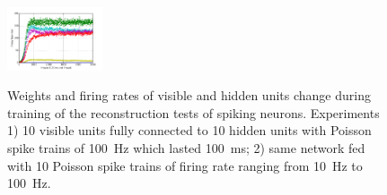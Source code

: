 \documentclass[conference]{IEEEtran}
\begin{document}
\begin{figure}
{			\centering
			\includegraphics[width=0.25\textwidth]{exp1_hid_s}
		}
		\\
		\caption{Weights and firing rates of visible and hidden units change during training of the reconstruction tests of spiking neurons. 
		Experiments 1) 10 visible units fully connected to 10 hidden units with Poisson spike trains of 100~Hz which lasted 100~ms; 2) same network fed with 10 Poisson spike trains of firing rate ranging from 10~Hz to 100~Hz.}
	\end{figure}
\end{document}
